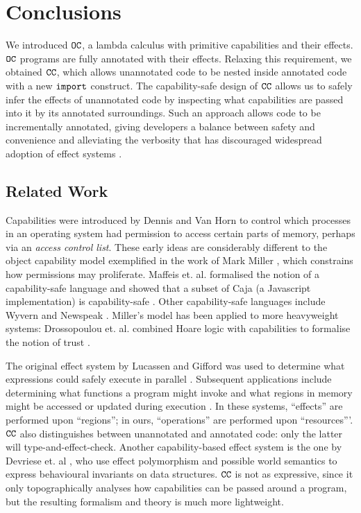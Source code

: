 
\section{Conclusions}

We introduced $\mathtt{OC}$, a lambda calculus with primitive capabilities and their effects. $\mathtt{OC}$ programs are fully annotated with their effects. Relaxing this requirement, we obtained $\mathtt{CC}$, which allows unannotated code to be nested inside annotated code with a new $\mathtt{import}$ construct. The capability-safe design of $\mathtt{CC}$ allows us to safely infer the effects of unannotated code by inspecting what capabilities are passed into it by its annotated surroundings. Such an approach allows code to be incrementally annotated, giving developers a balance between safety and convenience and alleviating the verbosity that has discouraged widespread adoption of effect systems \cite{rytz12}.

\subsection{Related Work}

Capabilities were introduced by Dennis and Van Horn \cite{dennis66} to control which processes in an operating system had permission to access certain parts of memory, perhaps via an \textit{access control list}. These early ideas are considerably different to the object capability model exemplified in the work of Mark Miller \cite{miller06}, which constrains how permissions may proliferate. Maffeis et. al. formalised the notion of a capability-safe language and showed that a subset of Caja (a Javascript implementation) is capability-safe \cite{maffeis10}. Other capability-safe languages include Wyvern \cite{nistor13} and Newspeak \cite{bracha10}. Miller's model has been applied to more heavyweight systems: Drossopoulou et. al. combined Hoare logic with capabilities to formalise the notion of trust \cite{drossopoulou07}.

The original effect system by Lucassen and Gifford was used to determine what expressions could safely execute in parallel \cite{lucassen88}. Subsequent applications include determining what functions a program might invoke \cite{tang94} and what regions in memory might be accessed or updated during execution \cite{talpin94}. In these systems, ``effects'' are performed upon ``regions''; in ours, ``operations'' are performed upon ``resources'''. $\mathtt{CC}$ also distinguishes between unannotated and annotated code: only the latter will type-and-effect-check. Another capability-based effect system is the one by Devriese et. al \cite{devriese 16}, who use effect polymorphism and possible world semantics to express behavioural invariants on data structures. $\mathtt{CC}$ is not as expressive, since it only topographically analyses how capabilities can be passed around a program, but the resulting formalism and theory is much more lightweight.


